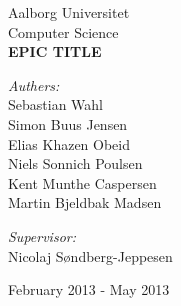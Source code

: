 \begin{titlingpage}
\color{fpcolor}
\centering
\vspace*{1.0cm}

\LARGE Aalborg Universitet\\[0.75cm]
\Large Computer Science\\[1.75cm]

\vspace{2.0cm}
{ \fontsize{70.2pt}{70.2pt} \bfseries {} EPIC TITLE}
\vspace{0.5cm}
\vspace{0.75cm}

\begin{minipage}{13.37cm}
  \begin{flushleft} \large
    \vspace{0pt}
    \emph{Authers:}\\
    Sebastian Wahl\\
    Simon Buus Jensen\\
    Elias Khazen Obeid\\
    Niels Sonnich Poulsen\\
    Kent Munthe Caspersen\\
    Martin Bjeldbak Madsen\\
  \end{flushleft}

  \begin{flushright} \large
    \vspace{-112pt}
    \emph{Supervisor:}\\
    Nicolaj Søndberg-Jeppesen
  \end{flushright}
\end{minipage}

\vfill

{\large February 2013 - May 2013}

\end{titlingpage}
